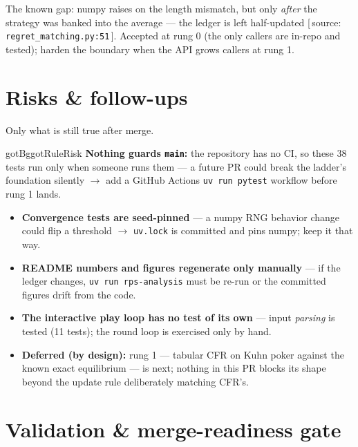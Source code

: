 \documentclass[11pt]{article}
\newenvironment{gotcha}{\begin{calloutbox}{gotBg}{gotRule}{Risk}}{\end{calloutbox}}
\newcommand{\source}[1]{{\small\textcolor{softgray}{[\,source: \texttt{#1}\,]}}}
\begin{document}
\noindent The known gap: numpy raises on the length mismatch, but only
\emph{after} the strategy was banked into the average --- the ledger is left
half-updated \source{regret\_matching.py:51}. Accepted at rung 0 (the only
callers are in-repo and tested); harden the boundary when the API grows
callers at rung 1.

\needspace{0.22\textheight}
\section{Risks \& follow-ups}

\noindent Only what is still true after merge.

\begin{gotcha}
\textbf{Nothing guards \texttt{main}:} the repository has no CI, so these 38
tests run only when someone runs them --- a future PR could break the ladder's
foundation silently $\to$ add a GitHub Actions \texttt{uv run pytest} workflow
before rung 1 lands.
\end{gotcha}

\begin{itemize}[leftmargin=*, nosep]
  \item \textbf{Convergence tests are seed-pinned} --- a numpy RNG behavior
        change could flip a threshold $\to$ \texttt{uv.lock} is committed and
        pins numpy; keep it that way.
  \item \textbf{README numbers and figures regenerate only manually} --- if the
        ledger changes, \texttt{uv run rps-analysis} must be re-run or the
        committed figures drift from the code.
  \item \textbf{The interactive play loop has no test of its own} --- input
        \emph{parsing} is tested (11 tests); the  round loop
        is exercised only by hand.
  \item \textbf{Deferred (by design):} rung 1 --- tabular CFR on Kuhn poker
        against the known exact equilibrium --- is next; nothing in this PR
        blocks its shape beyond the update rule deliberately matching CFR's.
\end{itemize}

\needspace{0.30\textheight}
\section{Validation \& merge-readiness gate}
\end{document}
